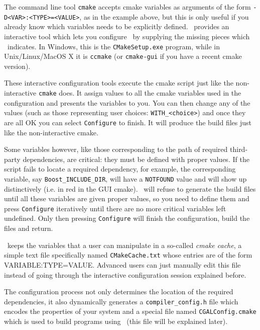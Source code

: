 The command line tool \texttt{cmake} accepts cmake variables as arguments of the form \texttt{-D<VAR>:<TYPE>=<VALUE>}, as
in the example above, but this is only useful if you already know which variables needs to be explicitly defined.
\cmake\ provides an interactive tool which lets you configure \cgal\ by supplying the missing pieces 
which \cmake\ indicates. In Windows, this is the \texttt{CMakeSetup.exe} program, while in Unix/Linux/MacOS X it is \texttt{ccmake}
(or \texttt{cmake-gui} if you have a recent cmake version). 

These interactive configuration tools execute the cmake script just like the non-interactive \texttt{cmake} does. It assign
values to all the cmake variables used in the configuration and presents the variables to you. You can then change 
any of the values (such as those representing user choices: \texttt{WITH\_<choice>}) and once they are all OK you can select 
\texttt{Configure} to finish. It will produce the build files just like the non-interactive cmake.

Some variables however, like those corresponding to the path of required third-party dependencies, are critical: they 
must be defined with proper values. If the script fails to locate a required dependency, for example, the corresponding variable,
say \texttt{Boost\_INCLUDE\_DIR}, will have a \texttt{NOTFOUND} value and will show up distinctively (i.e. in red in the GUI cmake).
\cmake\ will refuse to generate the build files until all these variables are given proper values, so you need
to define them and press \texttt{Configure} iteratively until there are no more critical variables left undefined. Only then
pressing \texttt{Configure} will finish the configuration, build the files and return.

\begin{ccAdvanced}
\cmake\ keeps the variables that a user can manipulate in a so-called {\em cmake cache}, a simple text file specifically 
named \texttt{CMakeCache.txt} whose entries are of the form VARIABLE:TYPE=VALUE. Advanced users can just manually edit this 
file instead of going through the interactive configuration session explained before.
\end{ccAdvanced}


The configuration process not only determines the location of the required dependencies, it also dynamically generates a
\texttt{compiler\_config.h} file which encodes the properties of your system and a special file named 
\texttt{CGALConfig.cmake} which is used to build programs using \cgal\ (this file will be explained later).

